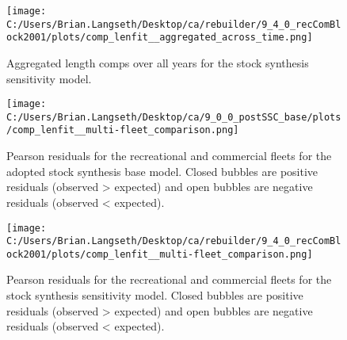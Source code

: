 \documentclass[11pt,
  english,
  a4paper,
]{article}
\begin{document}
\tagmcend\tagstructend


\begin{figure}
\centering
\texttt{[image: C:/Users/Brian.Langseth/Desktop/ca/rebuilder/9\_4\_0\_recComBlock2001/plots/comp\_lenfit\_\_aggregated\_across\_time.png]}
\caption{Aggregated length comps over all years for the stock synthesis sensitivity model.\label{fig:aggLenFit-sens}}
\end{figure}

\tagmcend\tagstructend


\begin{figure}
\centering
\texttt{[image: C:/Users/Brian.Langseth/Desktop/ca/9\_0\_0\_postSSC\_base/plots/comp\_lenfit\_\_multi-fleet\_comparison.png]}
\caption{Pearson residuals for the recreational and commercial fleets for the adopted stock synthesis base model. Closed bubbles are positive residuals (observed \textgreater{} expected) and open bubbles are negative residuals (observed \textless{} expected).\label{fig:Pearson-base}}
\end{figure}

\tagmcend\tagstructend


\begin{figure}
\centering
\texttt{[image: C:/Users/Brian.Langseth/Desktop/ca/rebuilder/9\_4\_0\_recComBlock2001/plots/comp\_lenfit\_\_multi-fleet\_comparison.png]}
\caption{Pearson residuals for the recreational and commercial fleets for the stock synthesis sensitivity model. Closed bubbles are positive residuals (observed \textgreater{} expected) and open bubbles are negative residuals (observed \textless{} expected).\label{fig:Pearson-sens}}
\end{figure}

\tagmcend\tagstructend
\end{document}
